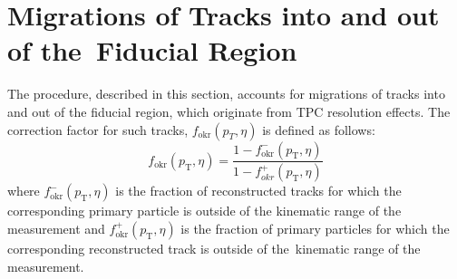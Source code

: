 \section{Migrations of Tracks into and out of the~Fiducial Region}\label{section:star_okr}
The procedure, described in this section, accounts for migrations of tracks into and out of the fiducial region, which originate from TPC resolution effects. The correction factor for such tracks, $f_\textrm{okr}(p_T, \eta)$ is defined as follows:
\begin{equation}
f_\textrm{okr}(p_\textrm{T}, \eta)=\frac{1-f_\textrm{okr}^-(p_\textrm{T}, \eta)}{1-f_{okr}^+(p_\textrm{T}, \eta)}
\end{equation}
where $f_\textrm{okr}^-(p_\textrm{T}, \eta)$ is the fraction of reconstructed tracks for which the corresponding primary particle is outside of the kinematic range of the measurement and $f_\textrm{okr}^+(p_\textrm{T}, \eta)$  is the fraction of primary particles for which the corresponding reconstructed track is outside of the~kinematic range of the measurement.


